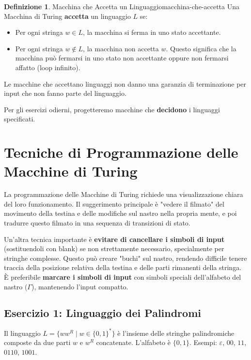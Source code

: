 \documentclass[a4paper]{article}
\theoremstyle{definition} %
\newtheorem{definition}{Definizione}
\begin{document}
\begin{definition}{Macchina che Accetta un Linguaggio}{macchina-che-accetta}
Una Macchina di Turing \textbf{accetta} un linguaggio $L$ se:
\begin{itemize}
    \item Per ogni stringa $w \in L$, la macchina si ferma in uno stato accettante.
    \item Per ogni stringa $w \notin L$, la macchina non accetta $w$. Questo significa che la macchina può fermarsi in uno stato non accettante oppure non fermarsi affatto (loop infinito).
\end{itemize}
Le macchine che accettano linguaggi non danno una garanzia di terminazione per input che non fanno parte del linguaggio.

Per gli esercizi odierni, progetteremo macchine che \textbf{decidono} i linguaggi specificati.
\end{definition}

\section{Tecniche di Programmazione delle Macchine di Turing}

La programmazione delle Macchine di Turing richiede una visualizzazione chiara del loro funzionamento. Il suggerimento principale è "vedere il filmato" del movimento della testina e delle modifiche sul nastro nella propria mente, e poi tradurre questo filmato in una sequenza di transizioni di stato.

Un'altra tecnica importante è \textbf{evitare di cancellare i simboli di input} (sostituendoli con blank) se non strettamente necessario, specialmente per stringhe complesse. Questo può creare "buchi" sul nastro, rendendo difficile tenere traccia della posizione relativa della testina e delle parti rimanenti della stringa. È preferibile \textbf{marcare i simboli di input} con simboli speciali dell'alfabeto del nastro ($\Gamma$), mantenendo l'input compatto.

\subsection{Esercizio 1: Linguaggio dei Palindromi}
Il linguaggio $L = \{ww^R \mid w \in \{0,1\}^*\}$ è l'insieme delle stringhe palindromiche composte da due parti $w$ e $w^R$ concatenate. L'alfabeto è $\{0,1\}$. Esempi: $\varepsilon$, $00$, $11$, $0110$, $1001$.
\end{document}
